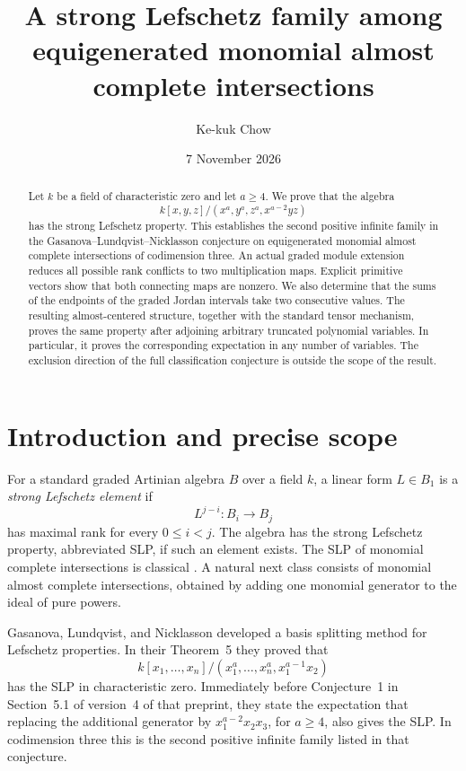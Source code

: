 \documentclass[11pt]{amsart}
\title[A strong Lefschetz family]{A strong Lefschetz family among equigenerated monomial almost complete intersections}
\author{Ke-kuk Chow}
\date{7 November 2026}
\theoremstyle{definition}
\begin{document}
\begin{abstract}
Let $k$ be a field of characteristic zero and let $a\ge4$. We prove that
the algebra
\[
 k[x,y,z]/(x^a,y^a,z^a,x^{a-2}yz)
\]
has the strong Lefschetz property.
This establishes the second positive infinite family in the
Gasanova--Lundqvist--Nicklasson conjecture on equigenerated monomial almost
complete intersections of codimension three. An actual graded module
extension reduces all possible rank conflicts to two multiplication maps.
Explicit primitive vectors show that both connecting maps are nonzero.
We also determine that the sums of the endpoints of the graded Jordan
intervals take two consecutive values. The resulting almost-centered
structure, together with the standard tensor mechanism, proves the same
property after adjoining arbitrary truncated polynomial variables.
In particular, it proves the corresponding expectation in any number of
variables. The exclusion direction of the full classification conjecture
is outside the scope of the result.
\end{abstract}
\maketitle

\section{Introduction and precise scope}

For a standard graded Artinian algebra $B$ over a field $k$, a linear form
$L\in B_1$ is a \emph{strong Lefschetz element} if
\[
 L^{j-i}:B_i\longrightarrow B_j
\]
has maximal rank for every $0\le i<j$. The algebra has the strong
Lefschetz property, abbreviated SLP, if such an element exists.
The SLP of monomial complete intersections is classical
\cite{Stanley1980}. A natural next class consists of monomial almost
complete intersections, obtained by adding one monomial generator to the
ideal of pure powers.

Gasanova, Lundqvist, and Nicklasson \cite{GLN2022} developed a basis
splitting method for Lefschetz properties. In their Theorem~5 they proved
that
\[
 k[x_1,\ldots,x_n]/(x_1^a,\ldots,x_n^a,x_1^{a-1}x_2)
\]
has the SLP in characteristic zero. Immediately before Conjecture~1 in
Section~5.1 of version~4 of that preprint, they state the expectation that replacing
the additional generator by $x_1^{a-2}x_2x_3$, for $a\ge4$, also gives the
SLP. In codimension three this is the second positive infinite family
listed in that conjecture.
\end{document}
